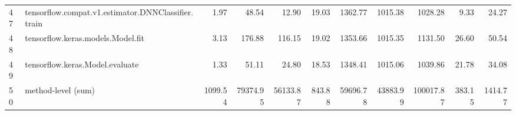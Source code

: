 \begin{tabular}{llrrrrrrrrr}
47 & tensorflow.compat.v1.estimator.DNNClassifier.train & 1.97 & 48.54 & 12.90 & 19.03 & 1362.77 & 1015.38 & 1028.28 & 9.33 & 24.27 \\
48 & tensorflow.keras.models.Model.fit & 3.13 & 176.88 & 116.15 & 19.02 & 1353.66 & 1015.35 & 1131.50 & 26.60 & 50.54 \\
49 & tensorflow.keras.Model.evaluate & 1.33 & 51.11 & 24.80 & 18.53 & 1348.41 & 1015.06 & 1039.86 & 21.78 & 34.08 \\
50 & method-level (sum) & 1099.54 & 79374.95 & 56133.87 & 843.88 & 59696.78 & 43883.99 & 100017.87 & 383.15 & 1414.77 \\
\end{tabular}
